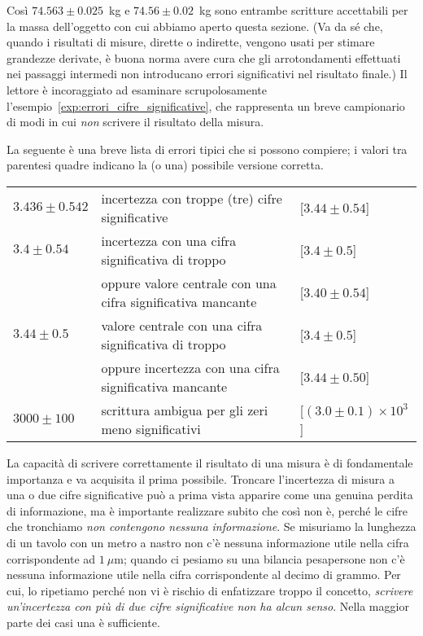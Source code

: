 Così $74.563 \pm 0.025$~kg e $74.56 \pm 0.02$~kg sono entrambe scritture
accettabili per la massa dell'oggetto con cui abbiamo aperto questa sezione.
(Va da sé che, quando i risultati di misure, dirette o indirette, vengono
usati per stimare grandezze derivate, è buona norma avere cura che gli
arrotondamenti effettuati nei passaggi intermedi non introducano errori
significativi nel risultato finale.) Il lettore è incoraggiato ad esaminare
scrupolosamente l'esempio~\ref{exp:errori_cifre_significative}, che rappresenta
un breve campionario di modi in cui \emph{non} scrivere il risultato della
misura.

\begin{examplebox}
  \begin{example}\label{exp:errori_cifre_significative}
    La seguente è una breve lista di errori tipici che si possono compiere;
    i valori tra parentesi quadre indicano la (o una) possibile versione
    corretta.

    \medskip
    \begin{tabular}{l@{\hskip 18pt}l@{\hskip 18pt}l}
      $3.436 \pm 0.542$ & incertezza con troppe (tre) cifre significative &
      [$3.44\pm0.54$]\\
      $3.4 \pm 0.54$ & incertezza con una cifra significativa di troppo &
      [$3.4 \pm 0.5$]\\
      & oppure valore centrale con una cifra significativa mancante &
      [$3.40 \pm 0.54$]\\
      $3.44 \pm 0.5$ & valore centrale con una cifra significativa di troppo &
      [$3.4 \pm 0.5$]\\
      & oppure incertezza con una cifra significativa mancante &
      [$3.44 \pm 0.50$]\\
      $3000 \pm 100$ & scrittura ambigua per gli zeri meno significativi &
      [$(3.0 \pm 0.1)\times 10^3$]
    \end{tabular}
  \end{example}
\end{examplebox}

La capacità di scrivere correttamente il risultato di una misura è di
fondamentale importanza e va acquisita il prima possibile. Troncare l'incertezza
di misura a una o due cifre significative può a prima vista apparire come una
genuina perdita di informazione, ma è importante realizzare subito che così
non è, perché le cifre che tronchiamo
\emph{non contengono nessuna informazione}.
Se misuriamo la lunghezza di un tavolo con un metro a nastro non c'è nessuna
informazione utile nella cifra corrispondente ad $1~\mu$m; quando ci pesiamo su
una bilancia pesapersone non c'è nessuna informazione utile nella cifra
corrispondente al decimo di grammo. Per cui, lo ripetiamo perché non vi
è rischio di enfatizzare troppo il concetto,
\emph{scrivere un'incertezza con più di due cifre significative non ha alcun
  senso}. Nella maggior parte dei casi una è sufficiente.

